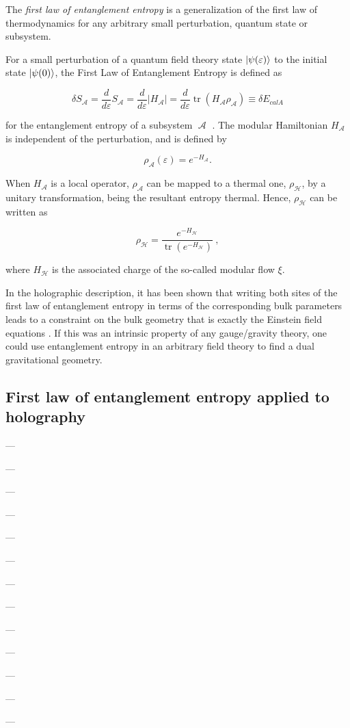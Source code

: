 \documentclass[twocolumn]{revtex4}
\providecommand{\abs}[1]{\lvert#1\rvert}
\providecommand{\eq}[2]{
    \begin{equation}
        #2
    \label{eq:#1}
    \end{equation}
}
\DeclareMathOperator{\calA}{\mathcal{A}}
\DeclareMathOperator{\calH}{\mathcal{H}}
\DeclareMathOperator{\tr}{tr}
\begin{document}
The \textit{first law of entanglement entropy} is a generalization of the first law of thermodynamics for any arbitrary small perturbation, quantum state or subsystem.

For a small perturbation of a quantum field theory state $\ket{\psi(\varepsilon)}$ to the initial state $\ket{\psi(0)}$, the First Law of Entanglement Entropy is defined as
\eq{FLEE}{
    \delta S_{\calA} = \frac{d}{d \varepsilon} S_{\calA} = \frac{d}{d \varepsilon} \abs{H_{\calA}} = \frac{d}{d \varepsilon} \tr (H_{\calA} \rho_{\calA}) \equiv \delta E_{calA}
}
for the entanglement entropy of a subsystem $\calA$ \cite{fareghbal_first_2019}. The modular Hamiltonian $H_{\calA}$ is independent of the perturbation, and is defined by
\eq{modularH}{
    \rho_{\calA} (\varepsilon) = e^{-H_{\calA}}.
}

When $H_{\calA}$ is a local operator, $\rho_{\calA}$ can be mapped to a thermal one, $\rho_{\calH}$, by a unitary transformation, being the resultant entropy thermal. Hence, $\rho_{\calH}$ can be written as
\eq{modularH2}{
    \rho_{\calH} = \frac{e^{-H_{\calH}}}{\tr (e^{-H_{\calH}})} \ ,
}
where $H_{\calH}$ is the associated charge of the so-called modular flow $\xi$.

In the holographic description, it has been shown that writing both sites of the first law of entanglement entropy in terms of the corresponding bulk parameters leads to a constraint on the bulk geometry that is exactly the Einstein field equations \cite{fareghbal_first_2019}. If this was an intrinsic property of any gauge/gravity theory, one could use entanglement entropy in an arbitrary field theory to find a dual gravitational geometry.


\subsection{First law of entanglement entropy applied to holography} \label{ss:FLEE_H}

---

---

---

---

---

---

---

---

---

---

---

---

---
\end{document}
